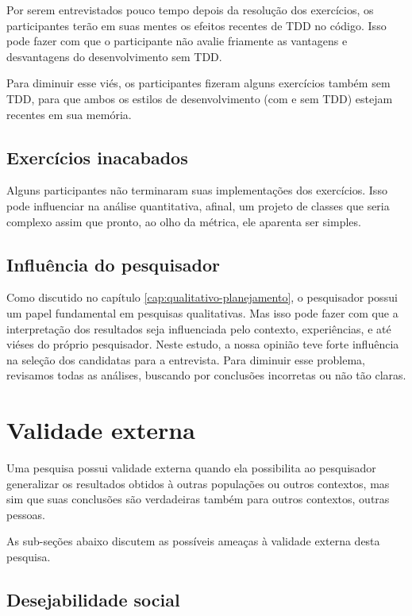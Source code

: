 Por serem entrevistados pouco tempo depois da resolução dos exercícios, os participantes terão
em suas mentes os efeitos recentes de TDD no código. Isso pode fazer com que o participante
não avalie friamente as vantagens e desvantagens do desenvolvimento sem TDD. 

Para diminuir esse viés, os participantes fizeram alguns exercícios também
sem TDD, para que ambos os estilos de desenvolvimento (com e sem TDD) estejam
recentes em sua memória.

\subsection{Exercícios inacabados}

Alguns participantes não terminaram suas implementações dos exercícios. Isso
pode influenciar na análise quantitativa, afinal, um projeto de classes que
seria complexo assim que pronto, ao olho da métrica, ele aparenta ser simples.

\subsection{Influência do pesquisador}

Como discutido no capítulo \ref{cap:qualitativo-planejamento}, o pesquisador possui
um papel fundamental em pesquisas qualitativas. Mas isso pode fazer com que
a interpretação dos resultados seja influenciada pelo contexto, experiências,
e até viéses do próprio pesquisador.
Neste estudo, a nossa opinião teve forte influência na seleção dos candidatas
para a entrevista.
Para diminuir esse problema, revisamos todas as análises,
buscando por conclusões incorretas ou não tão claras. 

\section{Validade externa}

Uma pesquisa possui validade externa quando ela possibilita ao pesquisador 
generalizar os resultados obtidos à outras populações ou outros contextos, 
mas sim que suas conclusões são verdadeiras também para outros contextos, outras pessoas. 

As sub-seções abaixo discutem as possíveis ameaças à validade externa
desta pesquisa.

\subsection{Desejabilidade social}

